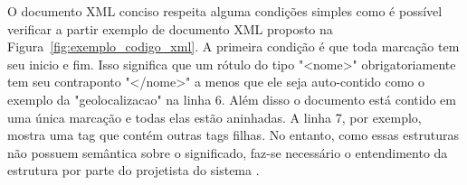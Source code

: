 O documento XML conciso respeita alguma condições simples como é possível verificar a partir exemplo de documento XML proposto na Figura~\ref{fig:exemplo_codigo_xml}. A primeira condição é que toda marcação tem seu inicio e fim. Isso significa que um rótulo do tipo "<nome>" obrigatoriamente tem seu contraponto "</nome>" a menos que ele seja auto-contido como o exemplo da "geolocalizacao" na linha 6. Além disso o documento está contido em uma única marcação e todas elas estão aninhadas. A linha 7, por exemplo, mostra uma tag que contém outras tags filhas. No entanto, como essas estruturas não possuem semântica sobre o significado, faz-se necessário o entendimento da estrutura por parte do projetista do sistema \citep{Allemang2011}.




